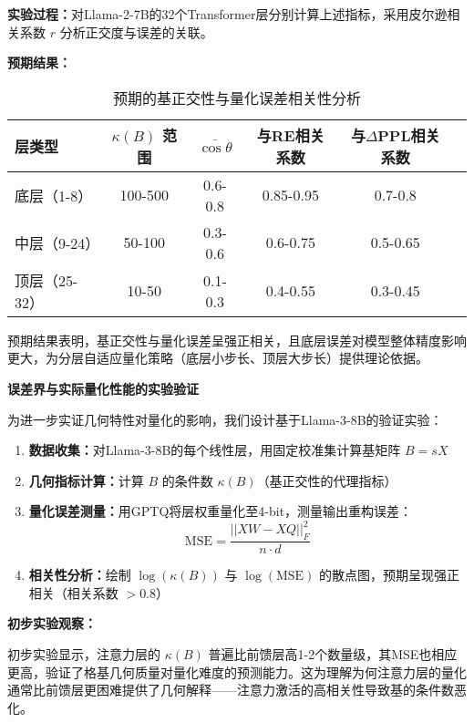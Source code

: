 \documentclass[letterpaper,twocolumn,10pt]{article}
\begin{document}
\textbf{实验过程：}对Llama-2-7B的32个Transformer层分别计算上述指标，采用皮尔逊相关系数 $r$ 分析正交度与误差的关联。

\textbf{预期结果：}

\begin{table*}[t]
\centering
\small
\begin{tabular}{lccccc}
\toprule
\textbf{层类型} & \textbf{$\kappa(B)$ 范围} & \textbf{$\bar{\cos\theta}$} & \textbf{与RE相关系数} & \textbf{与$\Delta$PPL相关系数} \\
\midrule
底层（1-8） & 100-500 & 0.6-0.8 & 0.85-0.95 & 0.7-0.8 \\
中层（9-24） & 50-100 & 0.3-0.6 & 0.6-0.75 & 0.5-0.65 \\
顶层（25-32） & 10-50 & 0.1-0.3 & 0.4-0.55 & 0.3-0.45 \\
\bottomrule
\end{tabular}
\caption{预期的基正交性与量化误差相关性分析}
\label{tab:orthogonality-correlation}
\end{table*}

预期结果表明，基正交性与量化误差呈强正相关，且底层误差对模型整体精度影响更大，为分层自适应量化策略（底层小步长、顶层大步长）提供理论依据。

\textbf{误差界与实际量化性能的实验验证}

为进一步实证几何特性对量化的影响，我们设计基于Llama-3-8B的验证实验：

\begin{enumerate}
\item \textbf{数据收集：}对Llama-3-8B的每个线性层，用固定校准集计算基矩阵 $B = sX$

\item \textbf{几何指标计算：}计算 $B$ 的条件数 $\kappa(B)$（基正交性的代理指标）

\item \textbf{量化误差测量：}用GPTQ将层权重量化至4-bit，测量输出重构误差：
$$\text{MSE} = \frac{||XW - XQ||_F^2}{n \cdot d}$$

\item \textbf{相关性分析：}绘制 $\log(\kappa(B))$ 与 $\log(\text{MSE})$ 的散点图，预期呈现强正相关（相关系数 $> 0.8$）
\end{enumerate}

\textbf{初步实验观察：}

初步实验显示，注意力层的 $\kappa(B)$ 普遍比前馈层高1-2个数量级，其MSE也相应更高，验证了格基几何质量对量化难度的预测能力。这为理解为何注意力层的量化通常比前馈层更困难提供了几何解释——注意力激活的高相关性导致基的条件数恶化。
\end{document}
